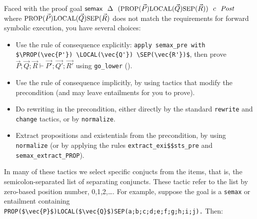 \documentclass[12pt,fleqn,openany,oneside,showtrims]{memoir}
\begin{document}
Faced with the proof goal
$\mathsf{semax}~~\Delta~~(\mbox{\small PROP}(\vec{P}) \mbox{\small LOCAL}(\vec{Q}) \mbox{\small SEP}(\vec{R}))~~c~~\mathit{Post}$
where $\mbox{\small PROP}(\vec{P}) \mbox{\small LOCAL}(\vec{Q}) \mbox{\small SEP}(\vec{R})$ does not match
the requirements for forward symbolic execution,
you have several choices:
\begin{itemize}
\item Use the rule of consequence explicitly:\newline
\lstinline|apply semax_pre with $\PROP(\vec{P'}) \LOCAL(\vec{Q'}) \SEP(\vec{R'})$|,\newline
then prove $\vec{P};\vec{Q};\vec{R}\vdash\vec{P'};\vec{Q'};\vec{R'}$ using
\lstinline{go_lower} ().
\item Use the rule of consequence implicitly,
by using tactics that modify the precondition
(and may leave entailments for you to prove).
\item Do rewriting in the precondition, either directly by the
standard \lstinline{rewrite} and \lstinline{change} tactics,
or by \lstinline{normalize}.
\item Extract propositions and existentials from the precondition,
by using \lstinline{normalize}
(or by applying the rules \lstinline{extract_exi$$sts_pre}
and \lstinline{semax_extract_PROP}).
\end{itemize}



In many of these tactics we select specific conjucts from the
\SEP{} items, that is, the semicolon-separated list of
separating conjuncts.  These tactic refer to the list
by zero-based position number, 0,1,2,\ldots.
\pagebreak
For example, suppose the goal is a \lstinline{semax}
or entailment containing \lstinline|PROP($\vec{P}$)LOCAL($\vec{Q}$)SEP(a;b;c;d;e;f;g;h;i;j).|
Then:
\end{document}
